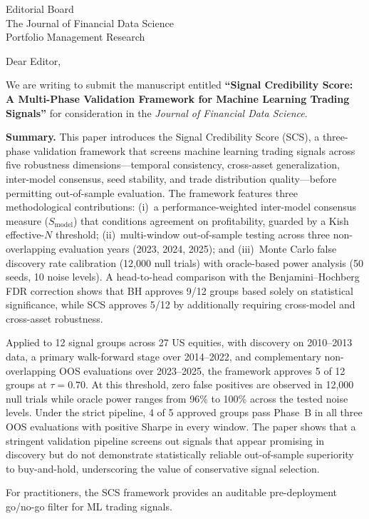 \documentclass[12pt,a4paper]{letter}
\begin{document}
\begin{letter}{Editorial Board\\The Journal of Financial Data Science\\Portfolio Management Research}

\opening{Dear Editor,}

We are writing to submit the manuscript entitled \textbf{``Signal Credibility Score: A Multi-Phase Validation Framework for Machine Learning Trading Signals''} for consideration in the \emph{Journal of Financial Data Science}.

\textbf{Summary.} This paper introduces the Signal Credibility Score (SCS), a three-phase validation framework that screens machine learning trading signals across five robustness dimensions---temporal consistency, cross-asset generalization, inter-model consensus, seed stability, and trade distribution quality---before permitting out-of-sample evaluation. The framework features three methodological contributions: (i)~a performance-weighted inter-model consensus measure ($S_{\mathrm{model}}$) that conditions agreement on profitability, guarded by a Kish effective-$N$ threshold; (ii)~multi-window out-of-sample testing across three non-overlapping evaluation years (2023, 2024, 2025); and (iii)~Monte Carlo false discovery rate calibration (12{,}000 null trials) with oracle-based power analysis (50 seeds, 10 noise levels). A head-to-head comparison with the Benjamini--Hochberg FDR correction shows that BH approves 9/12 groups based solely on statistical significance, while SCS approves 5/12 by additionally requiring cross-model and cross-asset robustness.

Applied to 12 signal groups across 27 US equities, with discovery on 2010--2013 data, a primary walk-forward stage over 2014--2022, and complementary non-overlapping OOS evaluations over 2023--2025, the framework approves 5 of 12 groups at $\tau=0.70$. At this threshold, zero false positives are observed in 12{,}000 null trials while oracle power ranges from 96\% to 100\% across the tested noise levels. Under the strict pipeline, 4 of 5 approved groups pass Phase~B in all three OOS evaluations with positive Sharpe in every window. The paper shows that a stringent validation pipeline screens out signals that appear promising in discovery but do not demonstrate statistically reliable out-of-sample superiority to buy-and-hold, underscoring the value of conservative signal selection.

For practitioners, the SCS framework provides an auditable pre-deployment go/no-go filter for ML trading signals.


\end{letter}
\end{document}

